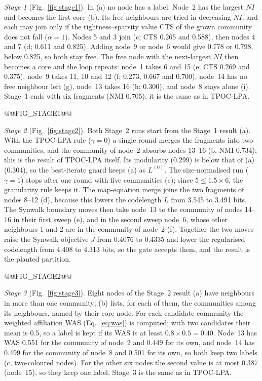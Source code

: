 \documentclass[conference]{IEEEtran}
\begin{document}
\emph{Stage 1} (Fig.~\ref{fig:stage1}). In (a) no node has a label. Node~2 has the largest $NI$ and becomes the first core (b). Its free neighbours are tried in decreasing $NI$, and each may join only if the tightness--sparsity value CTS of the grown community does not fall ($\alpha=1$). Nodes 5 and 3 join (c; CTS 0.265 and 0.588), then nodes 4 and 7 (d; 0.611 and 0.825). Adding node~9 or node~6 would give 0.778 or 0.798, below 0.825, so both stay free. The free node with the next-largest $NI$ then becomes a core and the loop repeats: node~1 takes 6 and 15 (e; CTS 0.269 and 0.375), node~9 takes 11, 10 and 12 (f; 0.273, 0.667 and 0.700), node~14 has no free neighbour left (g), node~13 takes 16 (h; 0.300), and node~8 stays alone (i). Stage~1 ends with six fragments (NMI 0.705); it is the same as in TPOC-LPA.

@@FIG_STAGE1@@

\emph{Stage 2} (Fig.~\ref{fig:stage2}). Both Stage~2 runs start from the Stage~1 result (a). With the TPOC-LPA rule ($\gamma=0$) a single round merges the fragments into two communities, and the community of node~2 absorbs nodes 13--16 (b, NMI 0.734); this is the result of TPOC-LPA itself. Its modularity (0.299) is below that of (a) (0.304), so the best-iterate guard keeps (a) as $L^{(0)}$. The size-normalised run ($\gamma=1$) stops after one round with five communities (c); since $5\le1.5\times6$, the granularity rule keeps it. The map-equation merge joins the two fragments of nodes 8--12 (d), because this lowers the codelength $L$ from 3.545 to 3.491 bits. The Synwalk boundary moves then take node~13 to the community of nodes 14--16 in their first sweep (e), and in the second sweep node~6, whose other neighbours 1 and 2 are in the community of node~2 (f). Together the two moves raise the Synwalk objective $J$ from 0.4076 to 0.4335 and lower the regularised codelength from 4.408 to 4.313 bits, so the gate accepts them, and the result is the planted partition.

@@FIG_STAGE2@@

\emph{Stage 3} (Fig.~\ref{fig:stage3}). Eight nodes of the Stage~2 result (a) have neighbours in more than one community; (b) lists, for each of them, the communities among its neighbours, named by their core node. For each candidate community the weighted affiliation WAS (Eq.~\eqref{eq:was}) is computed; with two candidates their mean is 0.5, so a label is kept if its WAS is at least $0.8\times0.5=0.40$. Node~13 has WAS 0.551 for the community of node~2 and 0.449 for its own, and node~14 has 0.499 for the community of node~8 and 0.501 for its own, so both keep two labels (c, two-coloured nodes). For the other six nodes the second value is at most 0.387 (node~15), so they keep one label. Stage~3 is the same as in TPOC-LPA.
\end{document}
